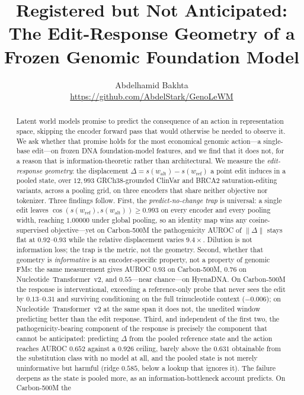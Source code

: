 \documentclass{article}
\title{Registered but Not Anticipated:\\
The Edit-Response Geometry of a Frozen Genomic Foundation Model}
\author{%
  Abdelhamid Bakhta\\
  \url{https://github.com/AbdelStark/GenoLeWM}
}
\newcommand{\wref}{w_{\mathrm{ref}}}
\newcommand{\walt}{w_{\mathrm{alt}}}
\newcommand{\carbon}{Carbon-500M\xspace}
\begin{document}
\maketitle

\begin{abstract}
Latent world models promise to predict the consequence of an action in representation space,
skipping the encoder forward pass that would otherwise be needed to observe it. We ask whether
that promise holds for the most economical genomic action---a single-base edit---on frozen DNA
foundation-model features, and we find that it does not, for a reason that is
information-theoretic rather than architectural. We measure the \emph{edit-response geometry}:
the displacement $\Delta = s(\walt) - s(\wref)$ a point edit induces in a pooled state, over
$12{,}993$ GRCh38-grounded ClinVar and BRCA2 saturation-editing variants, across a pooling grid,
on three encoders that share neither objective nor tokenizer. Three findings follow. First, the
\emph{predict-no-change trap} is universal: a single edit leaves $\cos(s(\wref),s(\walt)) \ge
0.993$ on every encoder and every pooling width, reaching $1.00000$ under global pooling, so an
identity map wins any cosine-supervised objective---yet on \carbon{} the pathogenicity AUROC of
$\lVert\Delta\rVert$ stays flat at $0.92$--$0.93$ while the relative displacement varies
$9.4\times$. Dilution is not information loss; the trap is the metric, not the geometry. Second,
whether that geometry is \emph{informative} is an encoder-specific property, not a property of
genomic FMs: the same measurement gives AUROC $0.93$ on \carbon{}, $0.76$ on
Nucleotide~Transformer~v2, and $0.55$---near chance---on HyenaDNA. On \carbon{} the response is
interventional, exceeding a reference-only probe that never sees the edit by $0.13$--$0.31$ and
surviving conditioning on the full trinucleotide context ($-0.006$); on Nucleotide~Transformer~v2
at the same span it does not, the unedited window predicting better than the edit response.
Third, and independent of the first two, the pathogenicity-bearing component of the response is
precisely the component that cannot be anticipated: predicting $\Delta$ from the pooled reference
state and the action reaches AUROC $0.652$ against a $0.926$ ceiling, barely above the $0.631$
obtainable from the substitution class with no model at all, and the pooled state is not merely
uninformative but harmful (ridge $0.585$, below a lookup that ignores it). The failure deepens as
the state is pooled more, as an information-bottleneck account predicts. On \carbon{} the

\end{abstract}
\end{document}
